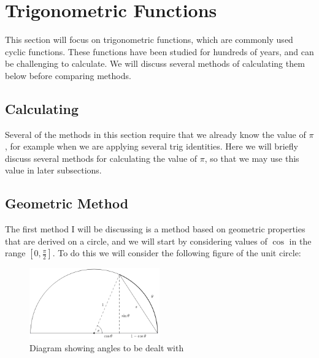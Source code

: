 \section{Trigonometric Functions}

This section will focus on trigonometric functions, which are commonly used cyclic functions. These functions have been studied for hundreds of years, and can be challenging to calculate. We will discuss several methods of calculating them below before comparing methods.


\subsection{Calculating \pi}
\label{SUB_"Calculating pi"}

Several of the methods in this section require that we already know the value of \(\pi\), for example when we are applying several trig identities. Here we will briefly discuss several methods for calculating the value of \(\pi\), so that we may use this value in later subsections.


\subsection{Geometric Method}
\label{SUB_"Trig Geometric Method"}

\theoremstyle{plain}
\newtheorem{Geo Trig Prop 1}{Proposition}[subsection]
\newtheorem{Geo Trig Prop 2}[Geo Trig Prop 1]{Proposition}
\newtheorem{Geo Trig Prop 3}[Geo Trig Prop 1]{Proposition}

The first method I will be discussing is a method based on geometric properties that are derived on a circle, and we will start by considering values of \(\cos\) in the range \([0, \frac{\pi}{2}]\). To do this we will consider the following figure of the unit circle:

\begin{figure}[!ht]
	\label{FIG_"Geometric Trig 1"}
	\caption{Diagram showing angles to be dealt with}
	\centering
	\includegraphics[width=0.5\textwidth]{"./Diagrams/Geometric Trig Diagram 1"}
\end{figure}

